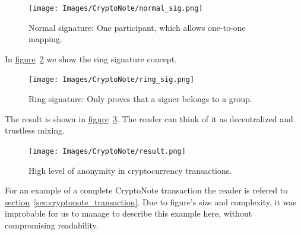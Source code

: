\begin{figure}[H]
  \centering
  \texttt{[image: Images/CryptoNote/normal\_sig.png]}
  \caption{Normal signature: One participant, which allows one-to-one mapping.~\cite{cryptonote}}
  \label{fig:normal_sig}
\end{figure}

In \hyperref[fig:ring_sig]{figure}~\ref{fig:ring_sig} we show the ring signature concept.

\begin{figure}[H]
  \centering
  \texttt{[image: Images/CryptoNote/ring\_sig.png]}
  \caption{Ring signature: Only proves that a signer belongs to a group.~\cite{cryptonote}}
  \label{fig:ring_sig}
\end{figure}

The result is shown in \hyperref[fig:result]{figure}~\ref{fig:result}. The reader can think of it as decentralized and trustless mixing.

\begin{figure}[H]
  \centering
  \texttt{[image: Images/CryptoNote/result.png]}
  \caption{High level of anonymity in cryptocurrency transactions.~\cite{cryptonote}}
  \label{fig:result}
\end{figure}

For an example of a complete CryptoNote transaction the reader is refered to  \hyperref[sec:cryptonote_transaction]{section}~\ref{sec:cryptonote_transaction}. Due to figure's size and complexity, it was improbable for us to manage to describe this example here, without compromising readability.
\pagebreak

